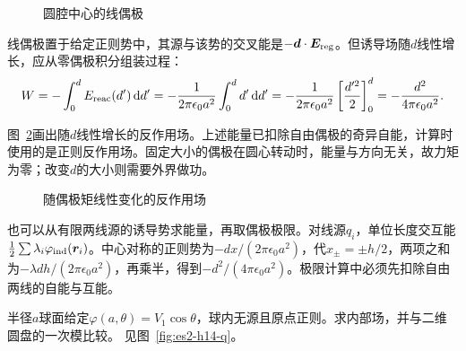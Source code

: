 \begin{figure}[H]\centering
{}
\caption{圆腔中心的线偶极}\label{fig:es2-h13-q}
\end{figure}
\begin{solution}
线偶极置于给定正则势中，其源与该势的交叉能是$-\bm{d}\cdot\bm{E}_{\rm reg}$。但诱导场随$d$线性增长，应从零偶极积分组装过程：
\[W=-\int_0^d E_{\rm reac}(d')\mathop{}\!\mathrm d d'
=-\frac1{2\pi\epsilon_0a^2}\int_0^dd'\mathop{}\!\mathrm d d'
=-\frac1{2\pi\epsilon_0a^2}\left[\frac{d'^2}2\right]_0^d
=-\frac{d^2}{4\pi\epsilon_0a^2}.\]

图~\ref{fig:es2-h13-s}画出随$d$线性增长的反作用场。上述能量已扣除自由偶极的奇异自能，计算时使用的是正则反作用场。固定大小的偶极在圆心转动时，能量与方向无关，故力矩为零；改变$d$的大小则需要外界做功。
\begin{figure}[H]\centering
{}
\caption{随偶极矩线性变化的反作用场}\label{fig:es2-h13-s}
\end{figure}


也可以从有限两线源的诱导势求能量，再取偶极极限。对线源$q_i$，单位长度交互能$\tfrac12\sum\lambda_i\varphi_{\rm ind}(\bm{r}_i)$。中心对称的正则势为$-dx/(2\pi\epsilon_0a^2)$，代$x_\pm=\pm h/2$，两项之和为$-\lambda dh/(2\pi\epsilon_0a^2)$，再乘半，得到$-d^2/(4\pi\epsilon_0a^2)$。极限计算中必须先扣除自由两线的自能与互能。
\end{solution}

\begin{exercise}[三维球边界的一次角模]\label{ex:es2-h14}
半径$a$球面给定$\varphi(a,\theta)=V_1\cos\theta$，球内无源且原点正则。求内部场，并与二维圆盘的一次模比较。 见图~\ref{fig:es2-h14-q}。
\end{exercise}

